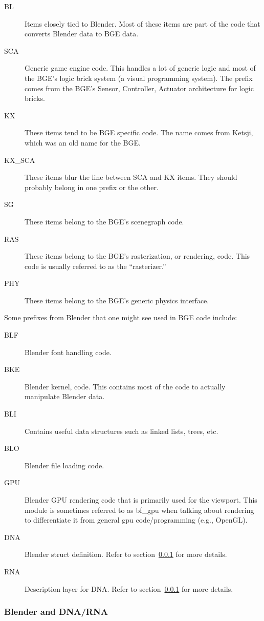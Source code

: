 \begin{description}
 \item[BL] Items closely tied to Blender. Most of these items are part of the code that converts Blender data to BGE data.
 \item[SCA] Generic game engine code. This handles a lot of generic logic and most of the BGE's logic brick system (a visual programming system). The prefix comes from the BGE's Sensor, Controller, Actuator architecture for logic bricks.
 \item [KX] These items tend to be BGE specific code. The name comes from Ketsji, which was an old name for the BGE.
 \item [KX\_SCA] These items blur the line between SCA and KX items. They should probably belong in one prefix or the other.
 \item [SG] These items belong to the BGE's scenegraph code.
 \item [RAS] These items belong to the BGE's rasterization, or rendering, code. This code is usually referred to as the ``rasterizer.''
 \item [PHY] These items belong to the BGE's generic physics interface.
\end{description}

Some prefixes from Blender that one might see used in BGE code include:

\begin{description}
 \item [BLF] Blender font handling code.
 \item [BKE] Blender kernel, code. This contains most of the code to actually manipulate Blender data.
 \item [BLI] Contains useful data structures such as linked lists, trees, etc.
 \item [BLO] Blender file loading code.
 \item [GPU] Blender GPU rendering code that is primarily used for the viewport. This module is sometimes referred to as bf\_gpu when talking about rendering to differentiate it from general gpu code/programming (e.g., OpenGL).
 \item [DNA] Blender struct definition. Refer to section~\ref{sec:bf_dna_rna} for more details.
 \item [RNA] Description layer for DNA. Refer to section~\ref{sec:bf_dna_rna} for more details.
\end{description}

\subsubsection{Blender and DNA/RNA}
\label{sec:bf_dna_rna}

